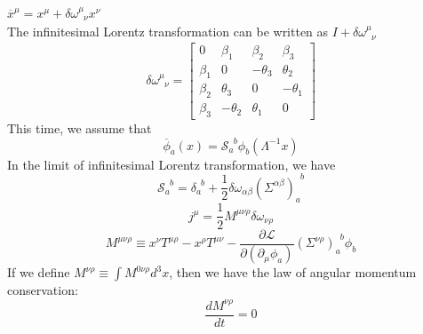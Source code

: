 \documentclass[cyan]{elegantnote}
\begin{document}
$\overline{x}^{\mu} = x^{\mu} + \delta \omega^{\mu}_{\phantom{\mu}\nu} x^{\nu}$\\
The infinitesimal Lorentz transformation can be written as $I+\delta \omega^{\mu}_{\phantom{\mu}\nu}$
\[\delta \omega^{\mu}_{\phantom{\mu}\nu} = \left[ 
\begin{matrix} 
0       & \beta_1   & \beta_2   & \beta_3   \\ 
\beta_1 & 0         & -\theta_3 & \theta_2  \\
\beta_2 & \theta_3  & 0         & -\theta_1 \\
\beta_3 & -\theta_2 & \theta_1  & 0
\end{matrix} 
\right]\]
This time, we assume that
\[\overline{\phi}_a(x) = \mathcal{S}_{a}^{\phantom{a}b}\phi_b(\Lambda^{-1}x)\]
In the limit of infinitesimal Lorentz transformation, we have
\[\mathcal{S}_{a}^{\phantom{a}b} = \delta_{a}^{\phantom{a}b}+\frac{1}{2} \delta \omega_{\alpha \beta} (\Sigma^{\alpha \beta})_{a}^{\phantom{a}b} \]
\[j^{\mu} = \frac{1}{2} M^{\mu \nu \rho}  \delta \omega_{\nu \rho}\]
\[M^{\mu \nu \rho} \equiv x^{\nu}T^{\mu \rho} - x^{\rho} T^{\mu \nu} - \frac{\partial \mathcal{L}}{\partial (\partial_{\mu}\phi_a)}(\Sigma^{\nu \rho})_{a}^{\phantom{a}b}\phi_b\]
If we define $M^{\nu \rho} \equiv \int M^{0 \nu \rho} d^3 x$, then we have the law of angular momentum conservation:
\[\frac{dM^{\nu \rho}}{dt} = 0\]
\end{document}
